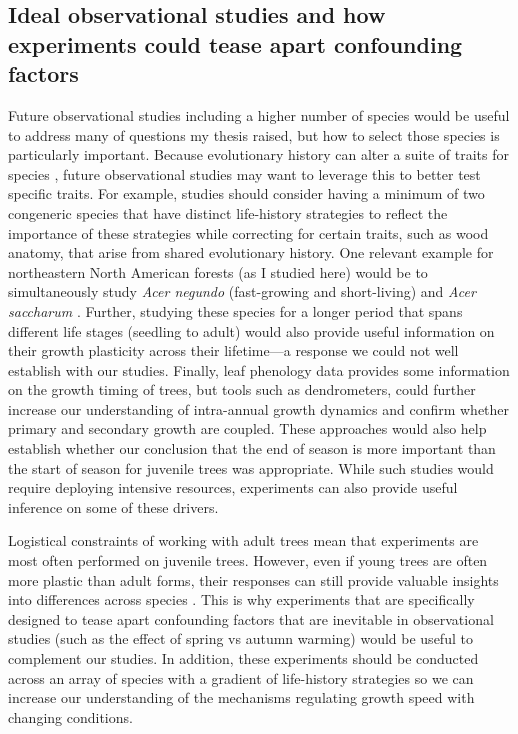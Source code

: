\subsection*{Ideal observational studies and how experiments could tease apart confounding factors}
Future observational studies including a higher number of species would be useful to address many of questions my thesis raised, but how to select those species is particularly important. Because evolutionary history can alter a suite of traits for species \citep{pagel_inferring_1999}, future observational studies may want to leverage this to better test specific traits. For example, studies should consider having a minimum of two congeneric species that have distinct life-history strategies to reflect the importance of these strategies while correcting for certain traits, such as wood anatomy, that arise from shared evolutionary history. One relevant example for northeastern North American forests (as I studied here) would be to simultaneously study \textit{Acer negundo} (fast-growing and short-living) and \textit{Acer saccharum} \citep[slow-growing and long-living;][]{burns_silvics_1990}. Further, studying these species for a longer period that spans different life stages (seedling to adult) would also provide useful information on their growth plasticity across their lifetime---a response we could not well establish with our studies. Finally, leaf phenology data provides some information on the growth timing of trees, but tools such as dendrometers, could further increase our understanding of intra-annual growth dynamics and confirm whether primary and secondary growth are coupled. These approaches would also help establish whether our conclusion that the end of season is more important than the start of season for juvenile trees was appropriate. While such studies would require deploying intensive resources, experiments can also provide useful inference on some of these drivers.

Logistical constraints of working with adult trees mean that experiments are most often performed on juvenile trees. However, even if young trees are often more plastic than adult forms, their responses can still provide valuable insights into differences across species \citep{vitasse_ontogenic_2013,wolkovich_why_2025}. This is why experiments that are specifically designed to tease apart confounding factors that are inevitable in observational studies (such as the effect of spring vs autumn warming) would be useful to complement our studies. In addition, these experiments should be conducted across an array of species with a gradient of life-history strategies so we can increase our understanding of the mechanisms regulating growth speed with changing conditions.

